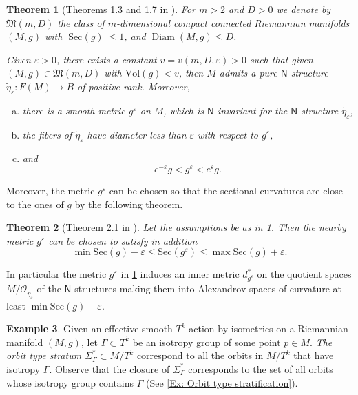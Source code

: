 \documentclass[12pt,a4paper,reqno]{amsart}
\newtheorem{theorem}{Theorem}[section]
\theoremstyle{definition}
\newtheorem{ex}[theorem]{Example}
\numberwithin{equation}{section}
\newcommand{\Ns}{\mathsf{N}}
\newcommand{\Sec}{\mathrm{Sec}}
\DeclareMathOperator{\diam}{Diam}
\begin{document}
\begin{theorem}[Theorems 1.3 and 1.7 in \cite{CheegerFukayaGromov1992}]\th\label{T: Existence of N structures on}
For $m>2$ and $D>0$ we denote by $\mathfrak{M}(m,D)$ the class of $m$-dimensional compact connected Riemannian manifolds $(M,g)$ with $|\Sec(g)|\leq 1$, and $\diam(M,g)\leq D$. 

Given $\varepsilon>0$, there exists a constant $v=v(m,D,\varepsilon)>0$ such that given $(M,g)\in \mathfrak{M}(m,D)$ with $\mathrm{Vol}(g)< v$, then $M$ admits a pure $\Ns$-structure $\widetilde{\eta}_\varepsilon\colon F(M) \to B$ of positive rank. Moreover, 
\begin{enumerate}[(a)]
\item there is a smooth metric $g^\varepsilon$ on $M$, which is $\Ns$-invariant for the $\Ns$-structure $\widetilde{\eta}_\varepsilon$,
\item the fibers of $\widetilde{\eta}_\varepsilon$ have diameter less than $\varepsilon$ with respect to $g^\varepsilon$, 
\item and
\[
e^{-\varepsilon} g< g^\varepsilon < e^{\varepsilon}g.
\]
\end{enumerate} 
\end{theorem}

Moreover, the metric $g^\varepsilon$ can be chosen so that the sectional curvatures are close to the ones of $g$ by the following theorem.

\begin{theorem}[Theorem 2.1 in \cite{Rong1996}]\th\label{T: Rong bounds sectional curvature}
Let the assumptions be as in \th\ref{T: Existence of N structures on}. Then the nearby metric $g^\varepsilon$ can  be chosen to satisfy in addition
\[
	\min \Sec(g) -\varepsilon \leq \Sec(g^\varepsilon) \leq\max \Sec(g)+\varepsilon.
\]
\end{theorem}

In particular the metric $g^\varepsilon$ in \th\ref{T: Existence of N structures on}  induces an inner metric $d_{g^\varepsilon}^\ast$ on the  quotient spaces $M/\mathscr{O}_{\tilde{\eta}_\varepsilon}$ of the $\Ns$-structures  making them into Alexandrov spaces of curvature at least $\min \Sec(g)-\varepsilon$. 


\begin{ex}\th\label	{Ex: orbit type stratification torus actions}
Given an effective smooth $T^k$-action by isometries on a Riemannian manifold $(M,g)$, let $\Gamma\subset T^k$ be an isotropy group of some point $p\in M$. \emph{The orbit type stratum $\Sigma_{\Gamma}^\ast\subset M/T^k$} correspond to all the orbits in $M/T^k$ that have isotropy $\Gamma$. Observe that the closure of $\Sigma_{\Gamma}^\ast$ corresponds to the set of all orbits whose isotropy group contains $\Gamma$ (See \th\ref{Ex: Orbit type stratification}).
\end{ex}
\end{document}
